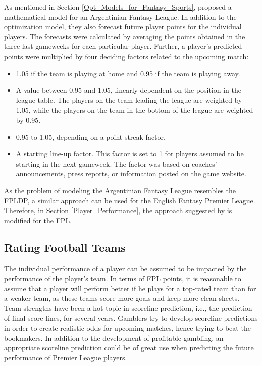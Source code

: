 \newpar

As mentioned in Section \ref{Opt_Models_for_Fantasy_Sports}, \cite{Bonomo} proposed a mathematical model for an Argentinian Fantasy League. In addition to the optimization model, they also forecast future player points for the individual players. The forecasts were calculated by averaging the points obtained in the three last gameweeks for each particular player. Further, a player's predicted points were multiplied by four deciding factors related to the upcoming match:
\begin{itemize}
    \item 1.05 if the team is playing at home and 0.95 if the team is playing away.
    \item A value between 0.95 and 1.05, linearly dependent on the position in the league table. The players on the team leading the league are weighted by 1.05, while the players on the team in the bottom of the league are weighted by 0.95.
    \item 0.95 to 1.05, depending on a point streak factor.
    \newpage
    \item A starting line-up factor. This factor is set to 1 for players assumed to be starting in the next gameweek. The factor was based on coaches’ announcements, press reports, or information posted on the game website. 
\end{itemize}

As the problem of modeling the Argentinian Fantasy League resembles the FPLDP, a similar approach can be used for the English Fantasy Premier League. Therefore, in Section \ref{Player_Performance}, the approach suggested by \cite{Bonomo} is modified for the FPL.

\subsection{Rating Football Teams} \label{Strength_of_football_teams} 

The individual performance of a player can be assumed to be impacted by the performance of the player's team. In terms of FPL points, it is reasonable to assume that a player will perform better if he plays for a top-rated team than for a weaker team, as these teams score more goals and keep more clean sheets. Team strengths have been a hot topic in scoreline prediction, i.e., the prediction of final score-lines, for several years. Gamblers try to develop scoreline predictions in order to create realistic odds for upcoming matches, hence trying to beat the bookmakers. In addition to the development of profitable gambling, an appropriate scoreline prediction could be of great use when predicting the future performance of Premier League players.


